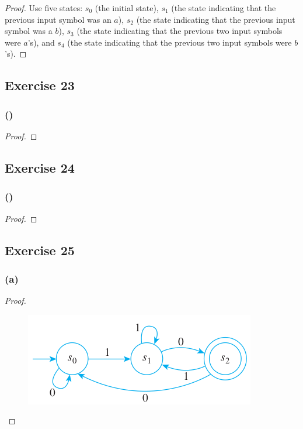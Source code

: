 \documentclass[14pt]{extarticle}
\begin{document}
\begin{proof}
Use five states: \(s_0\) (the initial state), \(s_1\) (the state indicating that the previous input symbol was an \(a\)), 
\(s_2\) (the state indicating that the previous input symbol was a \(b\)), \(s_3\) (the state indicating that the previous 
two input symbols were \(a\)’s), and \(s_4\) (the state indicating that the previous two input symbols were \(b\)’s).
\end{proof}

\subsection{Exercise 23}

\subsubsection{()}

\begin{proof}

\end{proof}

\subsection{Exercise 24}

\subsubsection{()}

\begin{proof}

\end{proof}

\subsection{Exercise 25}

\subsubsection{(a)}

\begin{proof}
\begin{figure}[ht!]
\centering
\includegraphics[scale=0.5]{../images/12.2.25.a.png}
\end{figure}
\end{proof}
\end{document}
